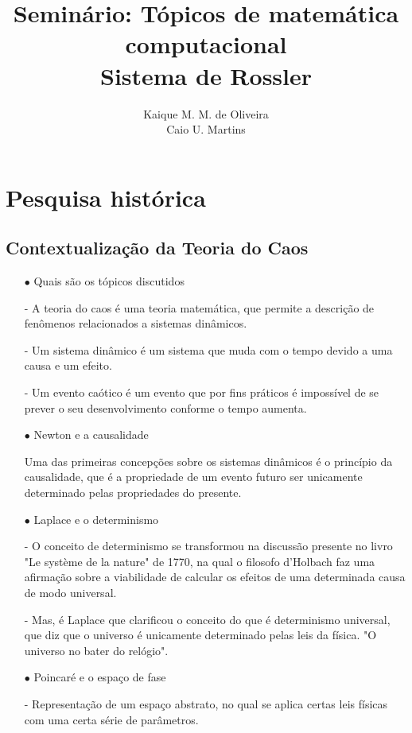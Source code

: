 \documentclass[12pt,a4paper]{article} %
\title{Seminário: Tópicos de matemática computacional \\ Sistema de Rossler}
\author{Kaique M. M. de Oliveira \\ Caio U. Martins}
\theoremstyle{definition}
\numberwithin{equation}{ex}
\theoremstyle{definition}
\begin{document}
\maketitle
\date{}

\section{Pesquisa histórica}

\subsection{Contextualização da Teoria do Caos}

\begin{itemize}
	\item [$\bullet$] Quais são os tópicos discutidos
	
	- A teoria do caos é uma teoria matemática, que permite a descrição de fenômenos relacionados a sistemas dinâmicos.

	- Um sistema dinâmico é um sistema que muda com o tempo devido a uma causa e um efeito.

	- Um evento caótico é um evento que por fins práticos é impossível de se prever o seu desenvolvimento conforme o tempo aumenta.
	
	\item [$\bullet$] Newton e a causalidade
	
	Uma das primeiras concepções sobre os sistemas dinâmicos é o princípio da causalidade, que é a propriedade de um evento futuro ser  unicamente determinado pelas propriedades do presente.
	
	\item [$\bullet$]  Laplace e o determinismo
	
	- O conceito de determinismo se transformou na discussão presente no livro "Le système de la nature" de 1770, na qual o filosofo d'Holbach faz uma afirmação sobre a viabilidade de calcular os efeitos de uma determinada causa de modo universal.
	
	- Mas, é Laplace que clarificou o conceito do que é determinismo universal, que diz que o universo é unicamente determinado pelas leis da física. "O universo no bater do relógio".
	
	\item [$\bullet$] Poincaré e o espaço de fase
	
	- Representação de um espaço abstrato, no qual se aplica certas leis físicas com uma certa série de parâmetros.
		

\end{itemize}
\end{document}
